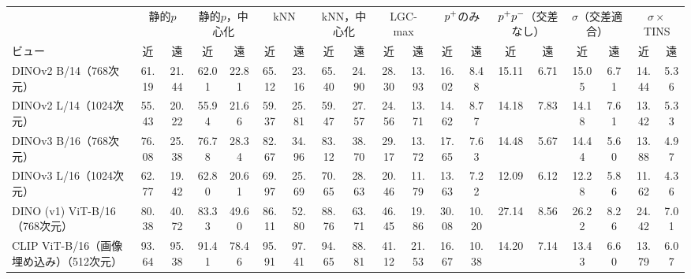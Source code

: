 {\fontsize{6.0pt}{7.1pt}\selectfont\renewcommand{\arraystretch}{1.0}%
\setlength{\tabcolsep}{1.3pt}\begin{tabular}{@{}lcc|cc|cc|cc|cc|cc|cc|cc|cc@{}}
\hline
\rule[-2.0pt]{0pt}{8.2pt} & \multicolumn{2}{c|}{静的$p$} & \multicolumn{2}{c|}{静的$p$，中心化} & \multicolumn{2}{c|}{kNN} & \multicolumn{2}{c|}{kNN，中心化} & \multicolumn{2}{c|}{LGC-max} & \multicolumn{2}{c|}{$p^{+}$のみ} & \multicolumn{2}{c|}{$p^{+}p^{-}$（交差なし）} & \multicolumn{2}{c|}{$\sigma$（交差適合）} & \multicolumn{2}{c}{$\sigma\times$TINS} \\
\rule[-2.0pt]{0pt}{8.2pt}ビュー & 近 & 遠 & 近 & 遠 & 近 & 遠 & 近 & 遠 & 近 & 遠 & 近 & 遠 & 近 & 遠 & 近 & 遠 & 近 & 遠 \\
\hline
DINOv2 B/14（768次元） & 61.19 & 21.44 & 62.01 & 22.81 & 65.12 & 23.16 & 65.40 & 24.90 & 28.30 & 13.93 & 16.02 & 8.48 & 15.11 & 6.71 & 15.05 & 6.71 & 14.44 & 5.36 \\
DINOv2 L/14（1024次元） & 55.43 & 20.22 & 55.94 & 21.66 & 59.37 & 25.81 & 59.47 & 27.57 & 24.56 & 13.71 & 14.62 & 8.77 & 14.18 & 7.83 & 14.18 & 7.61 & 13.42 & 5.33 \\
DINOv3 B/16（768次元） & 76.08 & 25.38 & 76.78 & 28.34 & 82.67 & 34.96 & 83.12 & 38.70 & 29.17 & 13.72 & 17.65 & 7.63 & 14.48 & 5.67 & 14.44 & 5.60 & 13.88 & 4.97 \\
DINOv3 L/16（1024次元） & 62.77 & 19.42 & 62.80 & 20.61 & 69.97 & 25.69 & 70.65 & 28.63 & 20.46 & 11.79 & 13.63 & 7.22 & 12.09 & 6.12 & 12.28 & 5.86 & 11.62 & 4.36 \\
DINO (v1) ViT-B/16（768次元） & 80.38 & 40.72 & 83.33 & 49.60 & 86.11 & 52.80 & 88.76 & 63.71 & 46.45 & 19.86 & 30.08 & 10.20 & 27.14 & 8.56 & 26.22 & 8.26 & 24.42 & 7.01 \\
CLIP ViT-B/16（画像埋め込み）（512次元） & 93.64 & 95.38 & 91.41 & 78.46 & 95.91 & 97.41 & 94.65 & 88.81 & 41.12 & 21.53 & 16.67 & 10.38 & 14.20 & 7.14 & 13.43 & 6.60 & 13.79 & 6.07 \\
\hline
\end{tabular}}%
